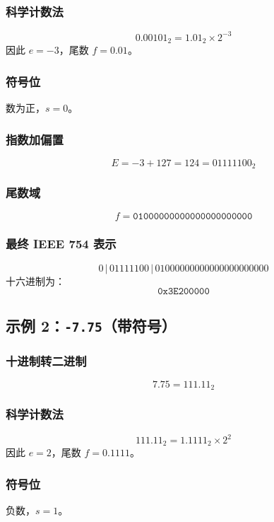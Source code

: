 \subsubsection*{科学计数法}
\[
0.00101_2 = 1.01_2 \times 2^{-3}
\]
因此 $e=-3$，尾数 $f=0.01$。

\subsubsection*{符号位}
数为正，$s = 0$。

\subsubsection*{指数加偏置}
\[
E = -3 + 127 = 124 = 01111100_2
\]

\subsubsection*{尾数域}
\[
f = \texttt{01000000000000000000000}
\]

\subsubsection*{最终 IEEE 754 表示}
\[
0 \,|\, 01111100 \,|\, 01000000000000000000000
\]
十六进制为：
\[
\texttt{0x3E200000}
\]













\newpage
\subsection{示例 2：\texttt{-7.75}（带符号）}

\subsubsection*{十进制转二进制}
\[
7.75 = 111.11_2
\]

\subsubsection*{科学计数法}
\[
111.11_2 = 1.1111_2 \times 2^2
\]
因此 $e=2$，尾数 $f=0.1111$。

\subsubsection*{符号位}
负数，$s=1$。

